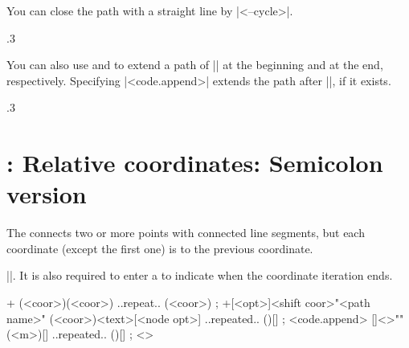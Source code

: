 You can close the path with a straight line by |<--cycle>|.

\begin{tzcode}{.3}
\end{tzcode}

You can also use \icmd{\tzlinesAtBegin} and \icmd{\tzlinesAtEnd} to extend a path of |\tzlines| at the beginning and at the end, respectively.
Specifying |<code.append>| extends the path after |\tzlinesAtEnd|, if it exists.

\begin{tzcode}{.3}
\end{tzcode}


\section{\protect\cmd{\tzlines+}: Relative coordinates: Semicolon version}
\label{s:tzlines+}

The  \icmd{\tzlines+} connects two or more points with connected line segments, but each coordinate (except the first one) is  to the previous coordinate. 

 |\tzlines|.
It is also required to enter a  to indicate when the coordinate iteration ends.


\begin{tzdef}{}
\tzlines+ (<coor>)(<coor>) ..repeat.. (<coor>) ;
\tzlines+[<opt>]<shift coor>"<path name>" 
         (<coor>){<text>}[<node opt>]
         ..repeated.. (){}[] ; <code.append>
  []<>"" (<m>){}[] ..repeated.. (){}[] ; <>
\end{tzdef}


